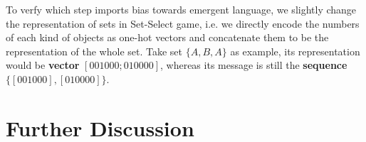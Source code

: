 To verfy which step imports bias towards emergent language, we slightly change the representation of sets in Set-Select game, i.e. we directly encode the numbers of each kind of objects as one-hot vectors and concatenate them to be the representation of the whole set. Take set $\{A, B, A\}$ as example, its representation would be \textbf{vector} $[0 0 1 0 0 0; 0 1 0 0 0 0]$, whereas its message is still the \textbf{sequence} $\{[0 0 1 0 0 0], [0 1 0 0 0 0]\}$. 

\section{Further Discussion}
\label{sec4.5:discuss}